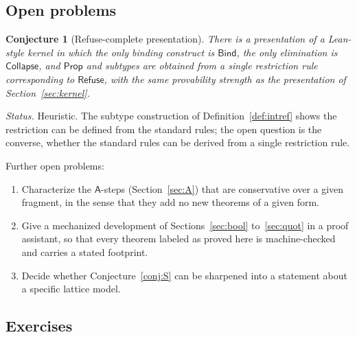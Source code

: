 \documentclass[11pt]{article}
\newcommand{\Refuse}{\mathsf{Refuse}}
\newcommand{\Bind}{\mathsf{Bind}}
\newcommand{\Coll}{\mathsf{Collapse}}
\newcommand{\Rev}{\mathsf{A}}
\newcommand{\Prop}{\mathsf{Prop}}
\theoremstyle{definition}
\theoremstyle{plain}
\newtheorem{conjecture}[definition]{Conjecture}
\theoremstyle{remark}
\begin{document}
\subsection{Open problems}

\begin{conjecture}[Refuse-complete presentation]\label{conj:complete}
There is a presentation of a Lean-style kernel in which the only binding construct is $\Bind$, the only elimination is $\Coll$, and $\Prop$ and subtypes are obtained from a single restriction rule corresponding to $\Refuse$, with the same provability strength as the presentation of Section~\ref{sec:kernel}.
\end{conjecture}

\emph{Status.} Heuristic. The subtype construction of Definition~\ref{def:intref} shows the restriction can be defined from the standard rules; the open question is the converse, whether the standard rules can be derived from a single restriction rule.

Further open problems:
\begin{enumerate}
\item Characterize the $\Rev$-steps (Section~\ref{sec:A}) that are conservative over a given fragment, in the sense that they add no new theorems of a given form.
\item Give a mechanized development of Sections~\ref{sec:bool} to~\ref{sec:quot} in a proof assistant, so that every theorem labeled as proved here is machine-checked and carries a stated footprint.
\item Decide whether Conjecture~\ref{conj:S} can be sharpened into a statement about a specific lattice model.
\end{enumerate}

\subsection{Exercises}
\end{document}
